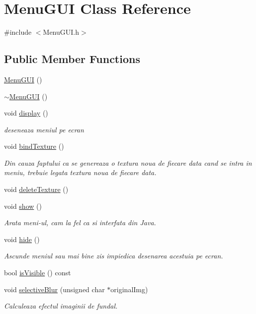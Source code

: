 \hypertarget{class_menu_g_u_i}{\section{Menu\-G\-U\-I Class Reference}
\label{class_menu_g_u_i}
}


{\ttfamily \#include $<$Menu\-G\-U\-I.\-h$>$}

\subsection*{Public Member Functions}
\begin{DoxyCompactItemize}
\item 
\hyperlink{class_menu_g_u_i_a2c41412095fc43e66c6acceb664a203c}{Menu\-G\-U\-I} ()
\item 
\hyperlink{class_menu_g_u_i_ade7e3f7fb26b4a0befb4cb3e0bf30cee}{$\sim$\-Menu\-G\-U\-I} ()
\item 
void \hyperlink{class_menu_g_u_i_abc57c1997de32e0c17713f9d20728186}{display} ()
\begin{DoxyCompactList}\small\item\em deseneaza meniul pe ecran \end{DoxyCompactList}\item 
void \hyperlink{class_menu_g_u_i_ae2a838fa10f38966e49580494057d25c}{bind\-Texture} ()
\begin{DoxyCompactList}\small\item\em Din cauza faptului ca se genereaza o textura noua de fiecare data cand se intra in meniu, trebuie legata textura noua de fiecare data. \end{DoxyCompactList}\item 
void \hyperlink{class_menu_g_u_i_a98ea7d1a53b4f583ead229f80b872ff5}{delete\-Texture} ()
\item 
void \hyperlink{class_menu_g_u_i_ad1fba8bb6d1851e4ab663ca869275162}{show} ()
\begin{DoxyCompactList}\small\item\em Arata meni-\/ul, cam la fel ca si interfata din Java. \end{DoxyCompactList}\item 
void \hyperlink{class_menu_g_u_i_ab86e29450e7bf0ded4f41213658f9291}{hide} ()
\begin{DoxyCompactList}\small\item\em Ascunde meniul sau mai bine zis impiedica desenarea acestuia pe ecran. \end{DoxyCompactList}\item 
bool \hyperlink{class_menu_g_u_i_a1a87191bece0e81a6fdbc0ea9fc1b823}{is\-Visible} () const 
\item 
void \hyperlink{class_menu_g_u_i_ab94886a43e3598ce490116bd06f3c828}{selective\-Blur} (unsigned char $\ast$original\-Img)
\begin{DoxyCompactList}\small\item\em Calculeaza efectul imaginii de fundal. \end{DoxyCompactList}\end{DoxyCompactItemize}
